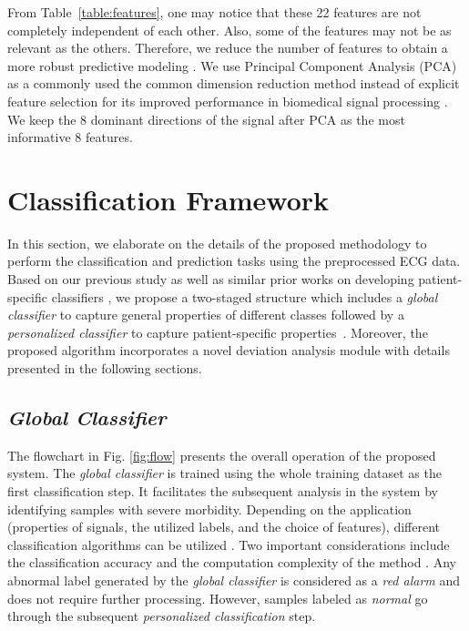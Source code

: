 From Table~\ref{table:features}, one may notice that these 22 features are not completely independent of each other. Also, some of the features may not be as relevant as the others. Therefore, we reduce the number of features to obtain a more robust predictive modeling \cite{autofs, llamedo2012automatic}. We use Principal Component Analysis (PCA) %
as a commonly used the common dimension reduction method instead of explicit feature selection for its improved performance in biomedical signal processing \cite{castells2007principal,martis2013ecg}. We keep the 8 dominant directions of the signal after PCA as the most informative 8 features.



\section{Classification Framework}


In this section, we elaborate on the details of the proposed methodology to perform the classification and prediction tasks using the preprocessed ECG data. Based on our previous study \cite{chen2018predictive} as well as similar prior works on developing patient-specific classifiers \cite{Hu_et_al,deChazal2006,llamedo2012automatic}, we propose a two-staged structure which includes a \textit{global classifier} to capture general properties of different classes followed by a \textit{personalized classifier} to capture patient-specific properties~\cite{chen2018predictive,Hu_et_al,deChazal2006,llamedo2012automatic}. Moreover, the proposed algorithm incorporates a novel deviation analysis module with details presented in the following sections. 

\subsection{\textit{Global Classifier}}

The flowchart in Fig. \ref{fig:flow} presents the overall operation of the proposed system. The \textit{global classifier} is trained using the whole training dataset as the first classification step. It facilitates the subsequent analysis in the system by identifying samples with severe morbidity. Depending on the application (properties of signals, the utilized labels, and the choice of features), different classification algorithms can be utilized \cite{Hu_et_al,llamedo2012automatic}. Two important considerations include the classification accuracy and the computation complexity of the method \cite{llamedo2012automatic}. Any abnormal label generated by the \textit{global classifier} is considered as a \textit{red alarm} and does not require further processing. However, samples labeled as \textit{normal} go through the subsequent \textit{personalized classification} step. 

